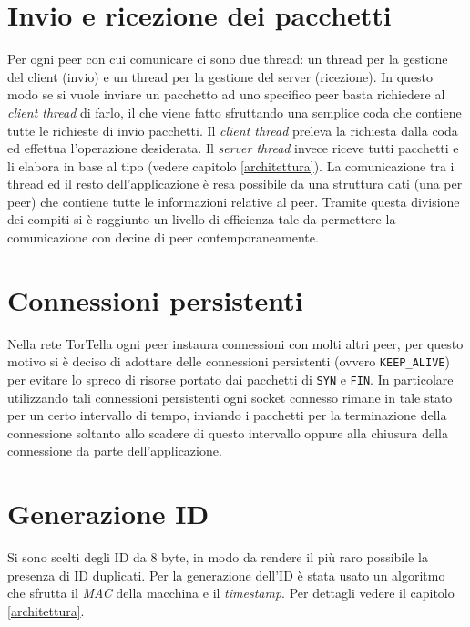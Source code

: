\section{Invio e ricezione dei pacchetti}
Per ogni peer con cui comunicare ci sono due thread: un thread per la gestione del client (invio) e un thread per la gestione del server (ricezione).
In questo modo se si vuole inviare un pacchetto ad uno specifico peer basta richiedere al \textit{client thread} di farlo, il che viene fatto sfruttando una semplice coda che contiene tutte le richieste di invio pacchetti. Il \textit{client thread} preleva la richiesta dalla coda ed effettua l'operazione desiderata.
Il \textit{server thread} invece riceve tutti pacchetti e li elabora in base al tipo (vedere capitolo \ref{architettura}). La comunicazione tra i thread ed il resto dell'applicazione è resa possibile da una struttura dati (una per peer) che contiene tutte le informazioni relative al peer. Tramite questa divisione dei compiti si è raggiunto un livello di efficienza tale da permettere la comunicazione con decine di peer contemporaneamente.
\section{Connessioni persistenti}
Nella rete TorTella ogni peer instaura connessioni con molti altri peer, per questo motivo si è deciso di adottare delle connessioni persistenti (ovvero \texttt{KEEP\_ALIVE}) per evitare lo spreco di risorse portato dai pacchetti di \texttt{SYN} e \texttt{FIN}. In particolare utilizzando tali connessioni persistenti ogni socket connesso rimane in tale stato per un certo intervallo di tempo, inviando i pacchetti per la terminazione della connessione soltanto allo scadere di questo intervallo oppure alla chiusura della connessione da parte dell'applicazione.
\section{Generazione ID}
Si sono scelti degli ID da 8 byte, in modo da rendere il più raro possibile la presenza di ID duplicati. Per la generazione dell'ID è stata usato un algoritmo che sfrutta il \textit{MAC} della macchina e il \textit{timestamp}. Per dettagli vedere il capitolo \ref{architettura}.
